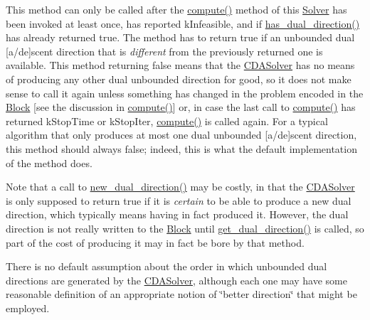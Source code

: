 This method can only be called after the \mbox{\hyperlink{class_s_m_spp__di__unipi__it_1_1_solver_a504d4e3e174c7a518cc66156a8a45ce5}{compute()}} method of this \mbox{\hyperlink{class_s_m_spp__di__unipi__it_1_1_solver}{Solver}} has been invoked at least once, has reported k\+Infeasible, and if \mbox{\hyperlink{class_s_m_spp__di__unipi__it_1_1_c_d_a_solver_a4247feaa72c255f28a2a71b5e634b60a}{has\+\_\+dual\+\_\+direction()}} has already returned true. The method has to return true if an unbounded dual \mbox{[}a/de\mbox{]}scent direction that is {\itshape different} from the previously returned one is available. This method returning false means that the \mbox{\hyperlink{class_s_m_spp__di__unipi__it_1_1_c_d_a_solver}{C\+D\+A\+Solver}} has no means of producing any other dual unbounded direction for good, so it does not make sense to call it again unless something has changed in the problem encoded in the \mbox{\hyperlink{class_s_m_spp__di__unipi__it_1_1_block}{Block}} \mbox{[}see the discussion in \mbox{\hyperlink{class_s_m_spp__di__unipi__it_1_1_solver_a504d4e3e174c7a518cc66156a8a45ce5}{compute()}}\mbox{]} or, in case the last call to \mbox{\hyperlink{class_s_m_spp__di__unipi__it_1_1_solver_a504d4e3e174c7a518cc66156a8a45ce5}{compute()}} has returned k\+Stop\+Time or k\+Stop\+Iter, \mbox{\hyperlink{class_s_m_spp__di__unipi__it_1_1_solver_a504d4e3e174c7a518cc66156a8a45ce5}{compute()}} is called again. For a typical algorithm that only produces at most one dual unbounded \mbox{[}a/de\mbox{]}scent direction, this method should always false; indeed, this is what the default implementation of the method does.

Note that a call to \mbox{\hyperlink{class_s_m_spp__di__unipi__it_1_1_c_d_a_solver_ad83925e362d49bbe570a881791e45ea0}{new\+\_\+dual\+\_\+direction()}} may be costly, in that the \mbox{\hyperlink{class_s_m_spp__di__unipi__it_1_1_c_d_a_solver}{C\+D\+A\+Solver}} is only supposed to return true if it is {\itshape certain} to be able to produce a new dual direction, which typically means having in fact produced it. However, the dual direction is not really written to the \mbox{\hyperlink{class_s_m_spp__di__unipi__it_1_1_block}{Block}} until \mbox{\hyperlink{class_s_m_spp__di__unipi__it_1_1_c_d_a_solver_a145672680f07ca7eef090900b8d6ddcf}{get\+\_\+dual\+\_\+direction()}} is called, so part of the cost of producing it may in fact be bore by that method.

There is no default assumption about the order in which unbounded dual directions are generated by the \mbox{\hyperlink{class_s_m_spp__di__unipi__it_1_1_c_d_a_solver}{C\+D\+A\+Solver}}, although each one may have some reasonable definition of an appropriate notion of \char`\"{}better direction\char`\"{} that might be employed.

